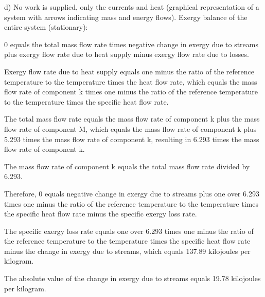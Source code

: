 d) No work is supplied, only the currents and heat (graphical representation of a system with arrows indicating mass and energy flows). Exergy balance of the entire system (stationary):

0 equals the total mass flow rate times negative change in exergy due to streams plus exergy flow rate due to heat supply minus exergy flow rate due to losses.

Exergy flow rate due to heat supply equals one minus the ratio of the reference temperature to the temperature times the heat flow rate, which equals the mass flow rate of component k times one minus the ratio of the reference temperature to the temperature times the specific heat flow rate.

The total mass flow rate equals the mass flow rate of component k plus the mass flow rate of component M, which equals the mass flow rate of component k plus 5.293 times the mass flow rate of component k, resulting in 6.293 times the mass flow rate of component k.

The mass flow rate of component k equals the total mass flow rate divided by 6.293.

Therefore, 0 equals negative change in exergy due to streams plus one over 6.293 times one minus the ratio of the reference temperature to the temperature times the specific heat flow rate minus the specific exergy loss rate.

The specific exergy loss rate equals one over 6.293 times one minus the ratio of the reference temperature to the temperature times the specific heat flow rate minus the change in exergy due to streams, which equals 137.89 kilojoules per kilogram.

The absolute value of the change in exergy due to streams equals 19.78 kilojoules per kilogram.